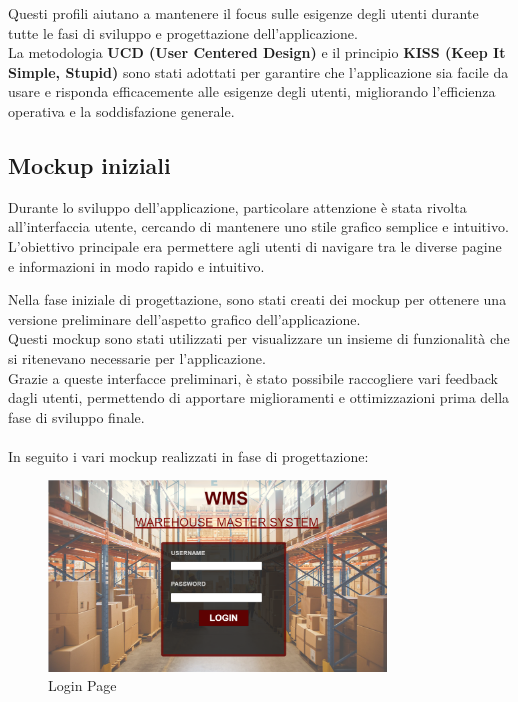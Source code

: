 Questi profili aiutano a mantenere il focus sulle esigenze degli utenti durante tutte le fasi di sviluppo e
progettazione dell'applicazione.\\ La metodologia \textbf{UCD (User Centered Design)} e il principio
\textbf{KISS (Keep It Simple, Stupid)} sono stati adottati per garantire che l'applicazione sia facile da usare e
risponda efficacemente alle esigenze degli utenti, migliorando l'efficienza operativa e la soddisfazione generale.

\newpage
\subsection{Mockup iniziali}

Durante lo sviluppo dell'applicazione, particolare attenzione è stata rivolta all'interfaccia utente,
cercando di mantenere uno stile grafico semplice e intuitivo.\\ L'obiettivo principale era permettere agli utenti di
navigare tra le diverse pagine e informazioni in modo rapido e intuitivo.

Nella fase iniziale di progettazione, sono stati creati dei mockup per ottenere una versione preliminare dell'aspetto
grafico dell'applicazione.\\ Questi mockup sono stati utilizzati per visualizzare un insieme di funzionalità che si
ritenevano necessarie per l'applicazione.\\ Grazie a queste interfacce preliminari, è stato possibile raccogliere vari
feedback dagli utenti, permettendo di apportare miglioramenti e ottimizzazioni prima della fase di sviluppo finale.\\
\\In seguito i vari mockup realizzati in fase di progettazione:

\begin{figure}[H]
    \centering
    \includegraphics[width=0.8\textwidth]{document/sections/img/login.png}
    \caption{Login Page}
    \label{fig:login}
\end{figure}

